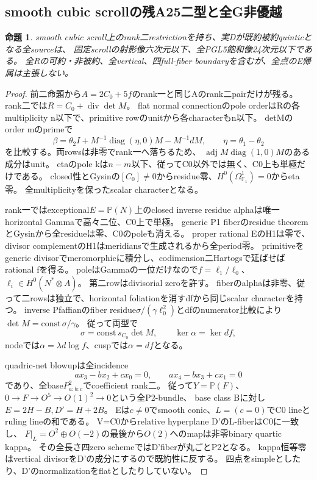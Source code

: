 \documentclass[a4paper,11pt]{ltjsarticle}
\newtheorem{proposition}{命題}[section]
\theoremstyle{definition}
\begin{document}
\subsection{smooth cubic scrollの残A25二型と全G非優越}
\begin{proposition}\label{prop:cubic-scroll-ranktwo-all-G}
smooth cubic scroll上のrank二restrictionを持ち、実Dが既約被約quinticとなる全sourceは、
固定scrollの射影像六次元以下、全PGL5飽和像24次元以下である。
全Rの可約・非被約、全vertical、四full-fiber boundaryを含むが、全点のE帰属は主張しない。
\end{proposition}
\begin{proof}
前二命題から$A=2C_0+5f$のrank一と同じAのrank二pairだけが残る。
rank二では$R=C_0+\operatorname{div}\det M$。
flat normal connectionのpole orderはRの各multiplicity n以下で、primitive rowのunitから各characterもn以下。
detMのorder mのprimeで
\[
 \beta=\theta_2I+M^{-1}\operatorname{diag}(\eta,0)M-M^{-1}dM,
 \qquad\eta=\theta_1-\theta_2
\]
を比較する。両rowsは非零でrank一へ落ちるため、
$\operatorname{adj}M\operatorname{diag}(1,0)M$のある成分はunit。
etaのpole kは$n-m$以下、従ってC0以外では無く、C0上も単極だけである。
closed性とGysinの$[C_0]\ne0$からresidue零、$H^0(\Omega^1_{\mathbb F_1})=0$からeta零。
全multiplicityを保ったscalar characterとなる。

rank一ではexceptional$E=\mathbb P(N)$上のclosed inverse residue alphaは唯一horizontal Gammaで高々二位、C0上で単極。
generic P1 fiberのresidue theoremとGysinから全residueは零、C0のpoleも消える。
proper rational EのH1は零で、divisor complementのH1はmeridiansで生成されるから全period零。
primitiveをgeneric divisorでmeromorphicに積分し、codimension二Hartogsで延ばせばrational fを得る。
poleはGammaの一位だけなので$f=\ell_1/\ell_0$、$\ell_i\in H^0(N^*\otimes A)$。
第二rowはdivisorial zeroを許す。
fiberのalphaは非零、従って二rowsは独立で、horizontal foliationを消すdfから同じscalar characterを持つ。
inverse Pfaffianのfiber residue$\sigma/(\gamma\ell_0^2)$とdfのnumerator比較により
$\det M=\mathrm{const}\,\sigma/\gamma$。
従って両型で
\[
 \sigma=\mathrm{const}\,s_{C_0}\det M,\qquad
 \ker\alpha=\ker df,
\]
nodeでは$\alpha=\lambda d\log f$、cuspでは$\alpha=df$となる。

quadric-net blowupは全incidence
\[
 ax_3-bx_2+cx_0=0,\qquad ax_4-bx_3+cx_1=0
\]
であり、全base$P^2_{a:b:c}$でcoefficient rank二。
従って$Y=\mathbb P(F)$、$0\to F\to O^5\to O(1)^2\to0$という全P2-bundle、
base class Bに対し$E=2H-B,D'=H+2B$。
Eは$c\ne0$でsmooth conic、$L=(c=0)$でC0 lineとruling lineの和である。
V=C0からrelative hyperplane D'のL-fiberはC0に一致し、
$F|_L=O^2\oplus O(-2)$の最後から$O(2)$へのmapは非零binary quartic kappa。
その全長さ四zero schemeではD'fiberが丸ごとP2となる。
kappa恒等零はvertical divisorをD'の成分にするので既約性に反する。
四点をsimpleとしたり、D'のnormalizationをflatとしたりしていない。


\end{proof}
\end{document}
